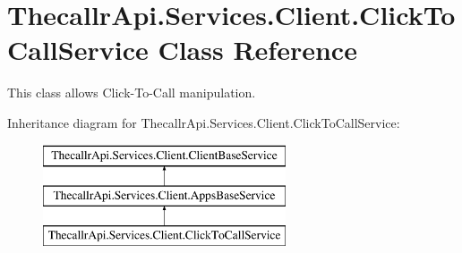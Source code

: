 \hypertarget{class_thecallr_api_1_1_services_1_1_client_1_1_click_to_call_service}{\section{Thecallr\+Api.\+Services.\+Client.\+Click\+To\+Call\+Service Class Reference}
\label{class_thecallr_api_1_1_services_1_1_client_1_1_click_to_call_service}
}


This class allows Click-\/\+To-\/\+Call manipulation.  


Inheritance diagram for Thecallr\+Api.\+Services.\+Client.\+Click\+To\+Call\+Service\+:\begin{figure}[H]
\begin{center}
\leavevmode
\includegraphics[height=3.000000cm]{class_thecallr_api_1_1_services_1_1_client_1_1_click_to_call_service}
\end{center}
\end{figure}
